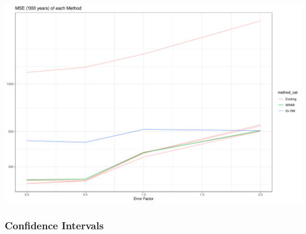 \documentclass[
]{article}
\begin{document}
\includegraphics{sim_exp-results_files/figure-latex/unnamed-chunk-4-1.pdf}

\hypertarget{confidence-intervals}{%
\subsubsection{Confidence Intervals}\label{confidence-intervals}}
\end{document}
